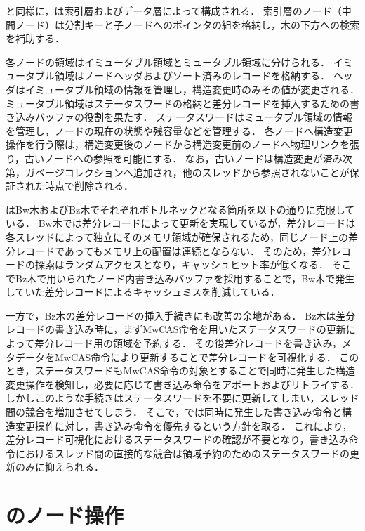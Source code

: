 \Bptree{}と同様に，\Bctree{}は索引層およびデータ層によって構成される．
索引層のノード（中間ノード）は分割キーと子ノードへのポインタの組を格納し，木の下方への検索を補助する．

各ノードの領域はイミュータブル領域とミュータブル領域に分けられる．
イミュータブル領域はノードヘッダおよびソート済みのレコードを格納する．
ヘッダはイミュータブル領域の情報を管理し，構造変更時のみその値が変更される．
ミュータブル領域はステータスワードの格納と差分レコードを挿入するための書き込みバッファの役割を果たす．
ステータスワードはミュータブル領域の情報を管理し，ノードの現在の状態や残容量などを管理する．
各ノードへ構造変更操作を行う際は，構造変更後のノードから構造変更前のノードへ物理リンクを張り，古いノードへの参照を可能にする．
なお，古いノードは構造変更が済み次第，ガベージコレクションへ追加され，他のスレッドから参照されないことが保証された時点で削除される．

\Bctree{}はBw木およびBz木でそれぞれボトルネックとなる箇所を以下の通りに克服している．
Bw木では差分レコードによって更新を実現しているが，差分レコードは各スレッドによって独立にそのメモリ領域が確保されるため，同じノード上の差分レコードであってもメモリ上の配置は連続とならない．
そのため，差分レコードの探索はランダムアクセスとなり，キャッシュヒット率が低くなる．
そこでBz木で用いられたノード内書き込みバッファを採用することで，Bw木で発生していた差分レコードによるキャッシュミスを削減している．

一方で，Bz木の差分レコードの挿入手続きにも改善の余地がある．
Bz木は差分レコードの書き込み時に，まずMwCAS命令を用いたステータスワードの更新によって差分レコード用の領域を予約する．
その後差分レコードを書き込み，メタデータをMwCAS命令により更新することで差分レコードを可視化する．
このとき，ステータスワードもMwCAS命令の対象とすることで同時に発生した構造変更操作を検知し，必要に応じて書き込み命令をアボートおよびリトライする．
しかしこのような手続きはステータスワードを不要に更新してしまい，スレッド間の競合を増加させてしまう．
そこで，\Bctree{}では同時に発生した書き込み命令と構造変更操作に対し，書き込み命令を優先するという方針を取る．
これにより，差分レコード可視化におけるステータスワードの確認が不要となり，書き込み命令におけるスレッド間の直接的な競合は領域予約のためのステータスワードの更新のみに抑えられる．

\section{\Bctree{}のノード操作}
\label{sec:node_operation}

